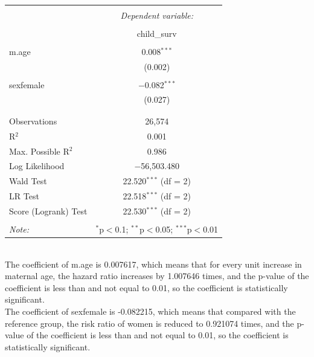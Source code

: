 \documentclass[12pt,letterpaper]{article}
\begin{document}
 \begin{table}[!htbp] \centering 
 	\caption{} 
 	\label{} 
 	\begin{tabular}{@{\extracolsep{5pt}}lc} 
 		\\[-1.8ex]\hline 
 		\hline \\[-1.8ex] 
 		& \multicolumn{1}{c}{\textit{Dependent variable:}} \\ 
 		\cline{2-2} 
 		\\[-1.8ex] & child\_surv \\ 
 		\hline \\[-1.8ex] 
 		m.age & 0.008$^{***}$ \\ 
 		& (0.002) \\ 
 		& \\ 
 		sexfemale & $-$0.082$^{***}$ \\ 
 		& (0.027) \\ 
 		& \\ 
 		\hline \\[-1.8ex] 
 		Observations & 26,574 \\ 
 		R$^{2}$ & 0.001 \\ 
 		Max. Possible R$^{2}$ & 0.986 \\ 
 		Log Likelihood & $-$56,503.480 \\ 
 		Wald Test & 22.520$^{***}$ (df = 2) \\ 
 		LR Test & 22.518$^{***}$ (df = 2) \\ 
 		Score (Logrank) Test & 22.530$^{***}$ (df = 2) \\ 
 		\hline 
 		\hline \\[-1.8ex] 
 		\textit{Note:}  & \multicolumn{1}{r}{$^{*}$p$<$0.1; $^{**}$p$<$0.05; $^{***}$p$<$0.01} \\ 
 	\end{tabular} 
 \end{table} \\
 The coefficient of m.age is 0.007617, which means that for every unit increase in maternal age, the hazard ratio increases by 1.007646 times, and the p-value of the coefficient is less than and not equal to 0.01, so the coefficient is statistically significant.\vspace{.25cm}\\
 The coefficient of sexfemale is -0.082215, which means that compared with the reference group, the risk ratio of women is reduced to 0.921074 times, and the p-value of the coefficient is less than and not equal to 0.01, so the coefficient is statistically significant.
 
\end{document}
